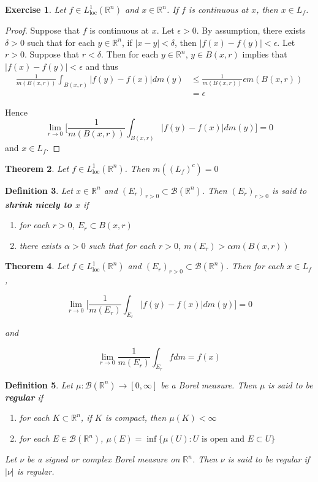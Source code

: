 \documentclass[12pt]{amsart}
\newtheorem{thm}{Theorem}[section]
\newtheorem{defn}[thm]{Definition}
\newtheorem{ex}[thm]{Exercise}
\newcommand{\al}{\alpha}
\newcommand{\del}{\delta}
\newcommand{\ep}{\epsilon}
\newcommand{\R}{\mathbb{R}}
\newcommand{\MB}{\mathcal{B}}
\newcommand{\RG}{[0,\infty]}
\newcommand{\Ll}{L^1_{\text{loc}}(\R^n)}
\begin{document}
\begin{ex}
Let $f \in \Ll$ and $x \in \R^n$. If $f$ is continuous at $x$, then $x \in L_f$.
\end{ex}

\begin{proof}
Suppose that $f$ is continuous at $x$. Let $\ep > 0$. By assumption, there exists $\del >0$ such that for each $y \in \R^n$, if $|x-y|< \del$, then $|f(x)-f(y)| < \ep$. Let $r >0$. Suppose that $r< \del$. Then for each $y \in \R^n$, $y \in B(x,r)$ implies that $|f(x) - f(y)| < \ep$ and thus 
\begin{align*}
\frac{1}{m(B(x,r))}\int_{B(x,r)}|f(y) - f(x)|dm(y)
& \leq \frac{1}{m(B(x,r))} \ep m(B(x,r))\\
&=\ep
\end{align*}

\newpage Hence $$\lim_{r \rightarrow 0} \bigg[ \frac{1}{m(B(x,r))}\int_{B(x,r)}|f(y) - f(x)|dm(y)\bigg] =0$$ 
and $x \in L_f$.
\end{proof}

\begin{thm}
Let $f \in \Ll$. Then $m((L_f)^c) = 0$
\end{thm}

\begin{defn}
Let $x \in \R^n$ and $(E_r)_{r>0} \subset \MB(\R^n)$. Then $(E_r)_{r>0}$ is said to \textbf{shrink nicely to $x$} if 

\begin{enumerate}
\item for each $r>0$, $E_r \subset B(x,r)$
\item there exists $\al >0$ such that for each $r>0$, $m(E_r)> \al m(B(x,r))$
\end{enumerate} 
\end{defn}

\begin{thm}
Let $f \in \Ll$ and $(E_r)_{r>0} \subset \MB(\R^n)$. Then for each $x \in L_f$, 

$$\lim_{r \rightarrow 0} \bigg[ \frac{1}{m(E_r)}\int_{E_r}|f(y) - f(x)|dm(y)\bigg] =0$$

and 

$$\lim_{r \rightarrow 0}  \frac{1}{m(E_r)}\int_{E_r}fdm = f(x)$$
\end{thm}

\begin{defn}
Let $\mu:\MB(\R^n) \rightarrow \RG$ be a Borel measure. Then $\mu$ is said to be \textbf{regular} if 
\begin{enumerate}
\item for each $K \subset \R^n$, if $K$ is compact, then $\mu(K)< \infty$
\item for each $E \in \MB(\R^n)$, $\mu(E) = \inf \{\mu(U): U \text{ is open and }E \subset U\}$
\end{enumerate}

Let $\nu$ be a signed or complex Borel measure on $\R^n$. Then $\nu$ is said to be regular if $|\nu|$ is regular.
\end{defn}
\end{document}
